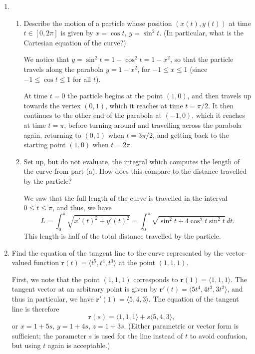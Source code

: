 \documentclass[12pt]{article}
\newcommand{\points}[1]{\marginpar{\hspace{24pt}[#1]}}
\begin{document}
\begin{enumerate}
\item \begin{enumerate}
\item Describe the motion of a particle whose position $(x(t),y(t))$ at time $t\in [0,2\pi]$ is given by $x=\cos t,\, y=\sin^2 t$. (In particular, what is the Cartesian equation of the curve?) \points{6}

\bigskip

We notice that $y=\sin^2 t = 1-\cos^2t = 1-x^2$, so that the particle travels along the parabola $y=1-x^2$, for $-1\leq x\leq 1$ (since $-1\leq \cos t\leq 1$ for all $t$).

At time $t=0$ the particle begins at the point $(1,0)$, and then travels up towards the vertex $(0,1)$, which it reaches at time $t=\pi/2$. It then continues to the other end of the parabola at $(-1,0)$, which it reaches at time $t=\pi$, before turning around and travelling across the parabola again, returning to $(0,1)$ when $t=3\pi/2$, and getting back to the starting point $(1,0)$ when $t=2\pi$.

\vspace{0.5in}

\item Set up, but do not evaluate, the integral which computes the length of the curve from part (a). How does this compare to the distance travelled by the particle? \points{4}

\bigskip

We saw that the full length of the curve is travelled in the interval $0\leq t\leq \pi$, and thus, we have
\[
L = \int_0^\pi\sqrt{x'(t)^2+y'(t)^2} = \int_0^\pi\sqrt{\sin^2t+4\cos^2t\sin^2t}\,dt.
\]
This length is half of the total distance travelled by the particle.

\vspace{0.5in}

\end{enumerate}
\item Find the equation of the tangent line to the curve represented by the vector-valued function $\mathbf{r}(t) = \langle t^5,t^4,t^3\rangle$ at the point $(1,1,1)$. \points{4}

\bigskip

First, we note that the point $(1,1,1)$ corresponds to $\mathbf{r}(1) = \langle 1,1,1\rangle$. The tangent vector at an arbitrary point is given by $\mathbf{r}'(t) = \langle 5t^4,4t^3,3t^2\rangle$, and thus in particular, we have $\mathbf{r}'(1) = \langle 5,4,3\rangle$. The equation of the tangent line is therefore
\[
\mathbf{r}(s) = \langle 1,1,1\rangle +s\langle 5,4,3\rangle,
\]
or $x=1+5s,\,y=1+4s,\, z=1+3s$. (Either parametric or vector form is sufficient; the parameter $s$ is used for the line instead of $t$ to avoid confusion, but using $t$ again is acceptable.)


\end{enumerate}
\end{document}
